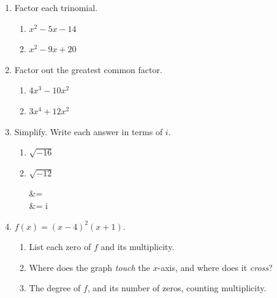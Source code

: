 \documentclass[10pt]{article}
\begin{document}

\vspace{0.12in}

\begin{enumerate}[itemsep=20pt]

\item Factor each trinomial.

\begin{enumerate}[label=(\alph*), itemsep=30pt]
  \item $x^2 - 5x - 14$ \hfill {}
  \item $x^2 - 9x + 20$ \hfill {}
\end{enumerate}

\item Factor out the greatest common factor.

\begin{enumerate}[label=(\alph*), itemsep=30pt]
  \item $4x^3 - 10x^2$ \hfill {}
  \item $3x^4 + 12x^2$ \hfill {}
\end{enumerate}

\item Simplify. Write each answer in terms of $i$.

\begin{enumerate}[label=(\alph*), itemsep=30pt]
  \item $\sqrt{-16}$ \hfill {}
  \item $\sqrt{-12}$

\begin{work}
   &= \cdot{}\cdot{} \\
             &= i  \cdot {}
\end{work}

  \hfill {}
\end{enumerate}

\item $f(x) = (x - 4)^2(x + 1)$.

\begin{enumerate}[label=(\alph*), itemsep=30pt]
  \item List each zero of $f$ and its multiplicity. \hfill {}
  \item Where does the graph \emph{touch} the $x$-axis, and where does it \emph{cross}? \hfill {}
  \item The degree of $f$, and its number of zeros, counting multiplicity. \hfill {}
\end{enumerate}

\end{enumerate}
\end{document}
